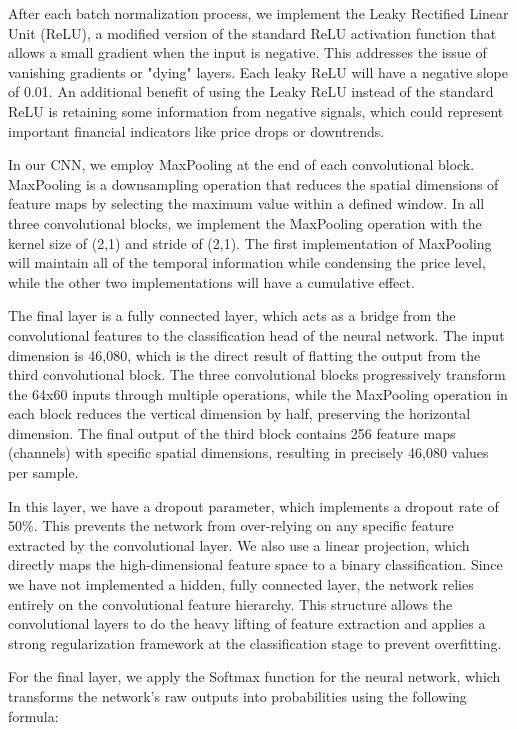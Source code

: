 \documentclass[12pt]{article}
\begin{document}
After each batch normalization process, we implement the Leaky Rectified Linear Unit (ReLU), a modified version of the standard ReLU activation function that allows a small gradient when the input is negative. This addresses the issue of vanishing gradients or "dying" layers. Each leaky ReLU will have a negative slope of 0.01. An additional benefit of using the Leaky ReLU instead of the standard ReLU is retaining some information from negative signals, which could represent important financial indicators like price drops or downtrends.

In our CNN, we employ MaxPooling at the end of each convolutional block. MaxPooling is a downsampling operation that reduces the spatial dimensions of feature maps by selecting the maximum value within a defined window. In all three convolutional blocks, we implement the MaxPooling operation with the kernel size of (2,1) and stride of (2,1). The first implementation of MaxPooling will maintain all of the temporal information while condensing the price level, while the other two implementations will have a cumulative effect.

The final layer is a fully connected layer, which acts as a bridge from the convolutional features to the classification head of the neural network. The input dimension is 46,080, which is the direct result of flatting the output from the third convolutional block. The three convolutional blocks progressively transform the 64x60 inputs through multiple operations, while the MaxPooling operation in each block reduces the vertical dimension by half, preserving the horizontal dimension. The final output of the third block contains 256 feature maps (channels) with specific spatial dimensions, resulting in precisely 46,080 values per sample.

In this layer, we have a dropout parameter, which implements a dropout rate of 50\%. This prevents the network from over-relying on any specific feature extracted by the convolutional layer. We also use a linear projection, which directly maps the high-dimensional feature space to a binary classification. Since we have not implemented a hidden, fully connected layer, the network relies entirely on the convolutional feature hierarchy. This structure allows the convolutional layers to do the heavy lifting of feature extraction and applies a strong regularization framework at the classification stage to prevent overfitting.

For the final layer, we apply the Softmax function for the neural network, which transforms the network's raw outputs into probabilities using the following formula:
\end{document}
